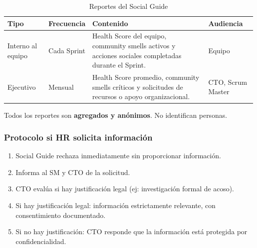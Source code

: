 \begin{table}[h]
    \centering
    \small
    \begin{tabularx}{\textwidth}{|l|l|X|l|}
        \hline
        \textbf{Tipo} & \textbf{Frecuencia}                                                                                  & \textbf{Contenido} & \textbf{Audiencia} \\
        \hline
        Interno al equipo
                      & Cada Sprint
                      & Health Score del equipo, community smells activos y acciones sociales completadas durante el Sprint.
                      & Equipo                                                                                                                                         \\
        \hline
        Ejecutivo
                      & Mensual
                      & Health Score promedio, community smells críticos y solicitudes de recursos o apoyo organizacional.
                      & CTO, Scrum Master                                                                                                                              \\
        \hline
    \end{tabularx}
    \caption{Reportes del Social Guide}
    \label{tab:reportes-social-guide}
\end{table}

\FloatBarrier

Todos los reportes son \textbf{agregados y anónimos}. No identifican personas.

\subsubsection{Protocolo si HR solicita información}

\begin{enumerate}
    \item Social Guide rechaza inmediatamente sin proporcionar información.
    \item Informa al SM y CTO de la solicitud.
    \item CTO evalúa si hay justificación legal (ej: investigación formal de acoso).
    \item Si hay justificación legal: información estrictamente relevante, con consentimiento documentado.
    \item Si no hay justificación: CTO responde que la información está protegida por confidencialidad.
\end{enumerate}

